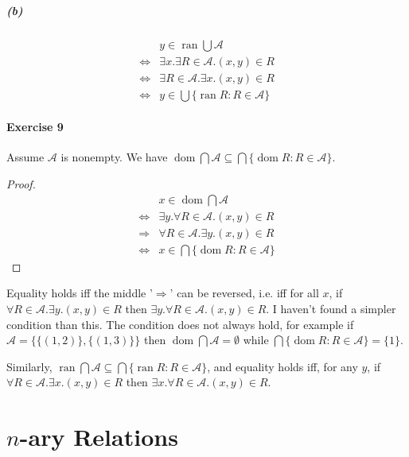\documentclass{report}
\newcommand{\dom}{\ensuremath{\operatorname{dom}}}
\newcommand{\ran}{\ensuremath{\operatorname{ran}}}
\begin{document}
    \subparagraph{(b)}
    \begin{align*}
        & y \in \ran \bigcup \mathcal{A} \\
        \Leftrightarrow & \exists x. \exists R \in \mathcal{A}. (x,y) \in R \\
        \Leftrightarrow & \exists R \in \mathcal{A}. \exists x. (x,y) \in R \\
        \Leftrightarrow & y \in \bigcup \{ \ran R : R \in \mathcal{A} \}
    \end{align*}

    \paragraph{Exercise 9}
    Assume $\mathcal{A}$ is nonempty.
    We have $\dom \bigcap \mathcal{A} \subseteq \bigcap \{ \dom R : R \in \mathcal{A} \}$.

    \begin{proof}
        \pf
            \begin{align*}
                & x \in \dom \bigcap \mathcal{A} \\
                \Leftrightarrow & \exists y. \forall R \in \mathcal{A}. (x,y) \in R \\
                \Rightarrow & \forall R \in \mathcal{A}. \exists y. (x,y) \in R \\
                \Leftrightarrow & x \in \bigcap \{ \dom R : R \in \mathcal{A} \}
            \end{align*}                    
    \end{proof}

    Equality holds iff the middle '$\Rightarrow$' can be reversed, i.e. iff for all $x$,
    if $\forall R \in \mathcal{A}. \exists y. (x,y) \in R$ then $\exists y. \forall R \in \mathcal{A}. (x,y) \in R$.
    I haven't found a simpler condition than this. The condition does not always hold, for example
    if $\mathcal{A} = \{ \{ (1,2) \}, \{ (1,3) \} \}$ then $\dom \bigcap \mathcal{A} = \emptyset$
    while $\bigcap \{ \dom R : R \in \mathcal{A} \} = \{1\}$.

    Similarly, $\ran \bigcap \mathcal{A} \subseteq \bigcap \{ \ran R : R \in \mathcal{A} \}$, and
    equality holds iff, for any $y$, if $\forall R \in \mathcal{A}. \exists x. (x,y) \in R$ then $\exists x. \forall R \in \mathcal{A}. (x,y) \in R$.

    \section{$n$-ary Relations}
\end{document}
